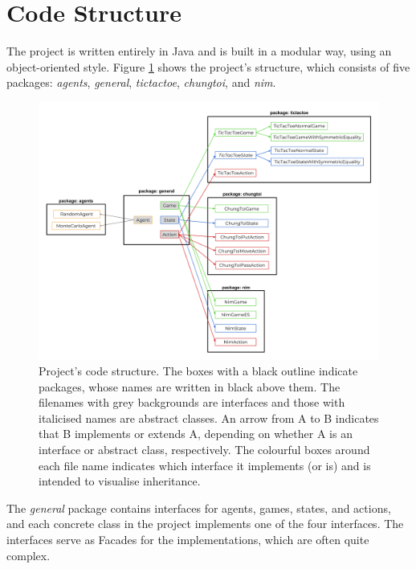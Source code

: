 \documentclass[11pt,a4paper]{report}
\begin{document}
\section{Code Structure}

The project is written entirely in Java and is built in a modular way, using an object-oriented style. Figure \ref{code-structure} shows the project's structure, which consists of five packages: \emph{agents}, \emph{general}, \emph{tictactoe}, \emph{chungtoi}, and \emph{nim}.

\begin{figure}[htbp]
	\begin{center}
		\includegraphics[width=\linewidth]{code_structure.png}
		\caption{Project's code structure. The boxes with a black outline indicate packages, whose names are written in black above them. The filenames with grey backgrounds are interfaces and those with italicised names are abstract classes. An arrow from A to B indicates that B implements or extends A, depending on whether A is an interface or abstract class, respectively. The colourful boxes around each file name indicates which interface it implements (or is) and is intended to visualise inheritance.}
		\label{code-structure}
	\end{center}
\end{figure}

The \emph{general} package contains interfaces for agents, games, states, and actions, and each concrete class in the project implements one of the four interfaces. The interfaces serve as Facades for the implementations, which are often quite complex.
\end{document}
